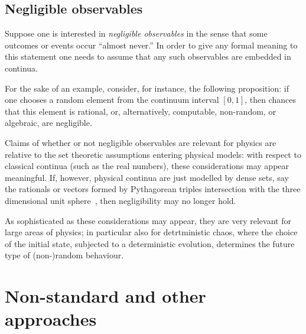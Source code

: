 \documentclass[11pt]{article}
\begin{document}
\subsection{Negligible observables}

Suppose one is interested in {\em negligible observables} in the sense that some outcomes or events occur ``almost never.''
In order to give any formal meaning to this statement one needs to assume that any such observables are embedded in continua.

For the sake of an example, consider, for instance, the following proposition: if one chooses a random element from the continuum interval $[0,1]$, then chances that this element
is rational, or, alternatively, computable, non-random, or algebraic, are negligible.

Claims of whether or not negligible observables are relevant for physics  \cite{wigner}
are relative to the set theoretic assumptions entering physical models: with respect to classical continua (such as the real numbers),
these considerations may appear meaningful.
If, however, physical continua are just modelled by dense sets,
say the rationals or vectors formed by Pythagorean triples intersection with the three dimensional unit sphere~\cite{godsil-zaks},
then negligibility may no longer hold.

As sophisticated as these considerations may appear, they are very relevant for large areas of physics;
in particular also for detrtministic chaos, where the choice of the initial state, subjected to a deterministic evolution,
determines the future type of (non-)random behaviour.






\section{Non-standard and other approaches}





%
%
%

\end{document}
